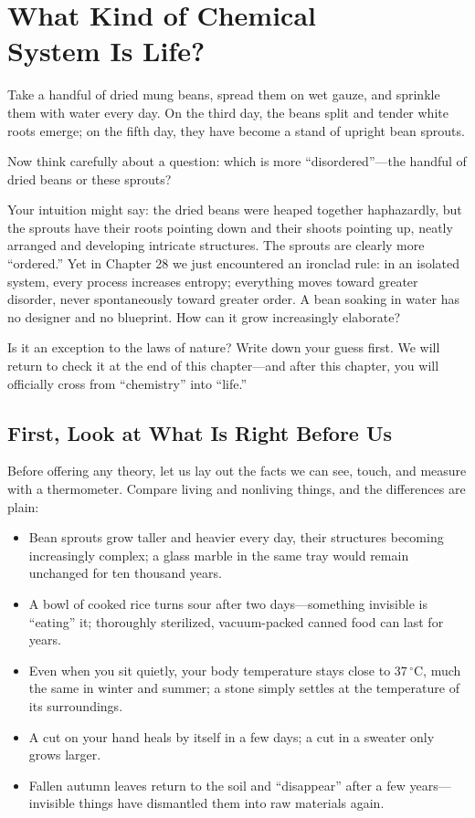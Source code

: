 \chapter[What Kind of Chemical System Is Life?]{What Kind of Chemical\protect\\ System Is Life?}

\begin{kaichang}
Take a handful of dried mung beans, spread them on wet gauze, and sprinkle them with water every day. On the third day, the beans split and tender white roots emerge; on the fifth day, they have become a stand of upright bean sprouts.

Now think carefully about a question: which is more ``disordered''---the handful of dried beans or these sprouts?

Your intuition might say: the dried beans were heaped together haphazardly, but the sprouts have their roots pointing down and their shoots pointing up, neatly arranged and developing intricate structures. The sprouts are clearly more ``ordered.'' Yet in Chapter 28 we just encountered an ironclad rule: in an isolated system, every process increases entropy; everything moves toward greater disorder, never spontaneously toward greater order. A bean soaking in water has no designer and no blueprint. How can it grow increasingly elaborate?

Is it an exception to the laws of nature? Write down your guess first. We will return to check it at the end of this chapter---and after this chapter, you will officially cross from ``chemistry'' into ``life.''
\end{kaichang}

\section{First, Look at What Is Right Before Us}

Before offering any theory, let us lay out the facts we can see, touch, and measure with a thermometer. Compare living and nonliving things, and the differences are plain:

\begin{itemize}[itemsep=2pt]
\item Bean sprouts grow taller and heavier every day, their structures becoming increasingly complex; a glass marble in the same tray would remain unchanged for ten thousand years.
\item A bowl of cooked rice turns sour after two days---something invisible is ``eating'' it; thoroughly sterilized, vacuum-packed canned food can last for years.
\item Even when you sit quietly, your body temperature stays close to $37\,^{\circ}\mathrm{C}$, much the same in winter and summer; a stone simply settles at the temperature of its surroundings.
\item A cut on your hand heals by itself in a few days; a cut in a sweater only grows larger.
\item Fallen autumn leaves return to the soil and ``disappear'' after a few years---invisible things have dismantled them into raw materials again.
\end{itemize}

